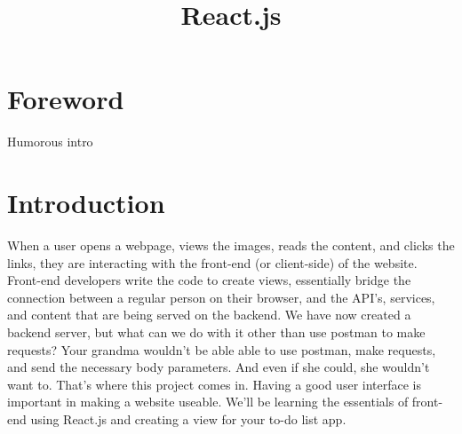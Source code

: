 \documentclass{42-en}
\begin{document}
\title{React.js}
\maketitle

\tableofcontents


\chapter{Foreword}

Humorous intro

\chapter{Introduction}

When a user opens a webpage, views the images, reads the content, and clicks the links, they are interacting with the front-end (or client-side) of the website. Front-end developers write the code to create views, essentially bridge the connection between a regular person on their browser, and the API’s, services, and content that are being served on the backend. We have now created a backend server, but what can we do with it other than use postman to make requests? Your grandma wouldn’t be able able to use postman, make requests, and send the necessary body parameters. And even if she could, she wouldn’t want to. That’s where this project comes in. Having a good user interface is important in making a website useable. We’ll be learning the essentials of front-end using React.js and creating a view for your to-do list app.
\end{document}
